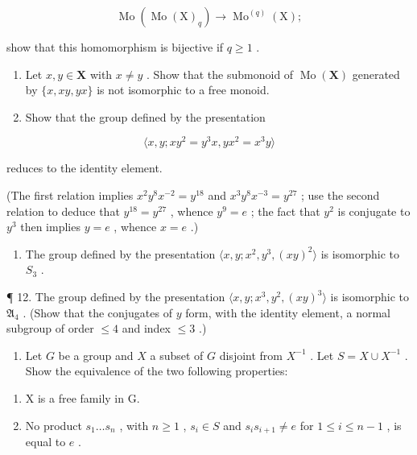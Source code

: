 \[
\operatorname{Mo} (\operatorname{Mo} (\mathrm{X}) _ {q}) \rightarrow \operatorname{Mo} ^ {(q)} (\mathrm{X});
\]

show that this homomorphism is bijective if \(q \geqslant 1\) .

\begin{enumerate}
\def\labelenumi{\arabic{enumi}.}
\setcounter{enumi}{8}
\item
  Let \(x, y \in \mathbf{X}\) with \(x \neq y\) . Show that the submonoid of \(\operatorname{Mo}(\mathbf{X})\) generated by \(\{x, xy, yx\}\) is not isomorphic to a free monoid.
\item
  Show that the group defined by the presentation
\end{enumerate}

\[
\langle x, y; x y ^ {2} = y ^ {3} x, y x ^ {2} = x ^ {3} y \rangle
\]

reduces to the identity element.

(The first relation implies \(x^{2}y^{8}x^{-2} = y^{18}\) and \(x^{3}y^{8}x^{-3} = y^{27}\) ; use the second relation to deduce that \(y^{18} = y^{27}\) , whence \(y^{9} = e\) ; the fact that \(y^{2}\) is conjugate to \(y^{3}\) then implies \(y = e\) , whence \(x = e\) .)

\begin{enumerate}
\def\labelenumi{\arabic{enumi}.}
\setcounter{enumi}{10}
\tightlist
\item
  The group defined by the presentation \(\langle x,y;x^{2},y^{3},(xy)^{2}\rangle\) is isomorphic to \(S_{3}\) .
\end{enumerate}

¶ 12. The group defined by the presentation \(\langle x, y; x^3, y^2, (xy)^3 \rangle\) is isomorphic to \(\mathfrak{A}_4\) . (Show that the conjugates of \(y\) form, with the identity element, a normal subgroup of order \(\leqslant 4\) and index \(\leqslant 3\) .)

\begin{enumerate}
\def\labelenumi{\arabic{enumi}.}
\setcounter{enumi}{12}
\tightlist
\item
  Let \(G\) be a group and \(X\) a subset of \(G\) disjoint from \(X^{-1}\) . Let \(S = X \cup X^{-1}\) . Show the equivalence of the two following properties:
\end{enumerate}

\begin{enumerate}
\def\labelenumi{(\roman{enumi})}
\item
  X is a free family in G.
\item
  No product \(s_1 \ldots s_n\) , with \(n \geqslant 1\) , \(s_i \in S\) and \(s_i s_{i+1} \neq e\) for \(1 \leqslant i \leqslant n-1\) , is equal to \(e\) .
\end{enumerate}

